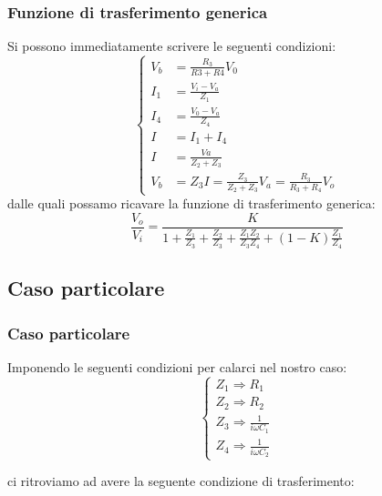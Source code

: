 			\begin{frame}[c]\frametitle{Funzione di trasferimento generica}
				Si possono immediatamente scrivere le seguenti condizioni:			
				\begin{equation}
				    \label{eq:equazioni}
				    \begin{cases}
				    	
				    	V_b & =\frac{R_3}{R3+R4} V_0 \\
				    	I_1 & =\frac{V_i-V_a}{Z_1} \\
				    	I_4 & =\frac{V_0-V_a}{Z_4}  \\
				    	I   & = I_1+I_4				\\
				    	I   & =\frac{Va}{Z_2+Z_3} \\ 
				    	V_b & = Z_3 I = \frac{Z_3}{Z_2+Z_3} V_a = \frac{R_3}{R_3+R_4} V_o

					\end{cases}
				\end{equation}
				dalle quali possamo ricavare la funzione di trasferimento generica:
				\begin{equation}
					\frac{V_o}{V_i}=\frac{K}{1+\frac{Z_1}{Z_3}+\frac{Z_2}{Z_3}+\frac{Z_1 Z_2}{Z_3 Z_4}+\left(1-K\right)\frac{Z_1}{Z_4}}
				\end{equation}
			\end{frame}



			\subsection{Caso particolare} %
			\label{sub:caso_particolare}
			
			\begin{frame}[c]\frametitle{Caso particolare}
			    
				Imponendo le seguenti condizioni per calarci nel nostro caso:
				\begin{equation}
				    \label{eq:Caso_particolare}
					\begin{cases}
					Z_1 \Longrightarrow R_1\\
					Z_2 \Longrightarrow R_2\\
					Z_3 \Longrightarrow \frac{1}{i \omega C_1}\\
					Z_4 \Longrightarrow \frac{1}{i \omega C_2}
					\end{cases}
				\end{equation}

				\pause

				ci ritroviamo ad avere la seguente condizione di trasferimento:

			\end{frame}

